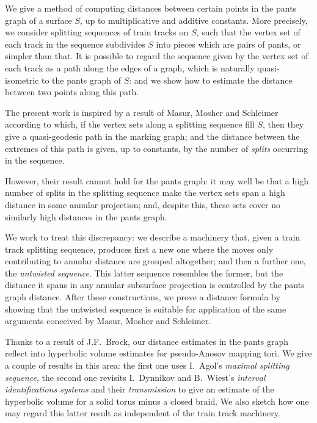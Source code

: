 We give a method of computing distances between certain points in the pants graph of a surface $S$, up to multiplicative and additive constants. More precisely, we consider splitting sequences of train tracks on $S$, such that the vertex set of each track in the sequence subdivides $S$ into pieces which are pairs of pants, or simpler than that. It is possible to regard the sequence given by the vertex set of each track as a path along the edges of a graph, which is naturally quasi-isometric to the pants graph of $S$: and we show how to estimate the distance between two points along this path.

The present work is inspired by a result of Masur, Mosher and Schleimer according to which, if the vertex sets along a splitting sequence fill $S$, then they give a quasi-geodesic path in the marking graph; and the distance between the extremes of this path is given, up to constants, by the number of \emph{splits} occurring in the sequence.

However, their result cannot hold for the pants graph: it may well be that a high number of splits in the splitting sequence make the vertex sets span a high distance in some annular projection; and, despite this, these sets cover no similarly high distances in the pants graph.

We work to treat this discrepancy: we describe a machinery that, given a train track splitting sequence, produces first a new one where the moves only contributing to annular distance are grouped altogether; and then a further one, the \emph{untwisted sequence}. This latter sequence resembles the former, but the distance it spans in any annular subsurface projection is controlled by the pants graph distance. After these constructions, we prove a distance formula by showing that the untwisted sequence is suitable for application of the same arguments conceived by Masur, Mosher and Schleimer.

Thanks to a result of J.F.~Brock, our distance estimates in the pants graph reflect into hyperbolic volume estimates for pseudo-Anosov mapping tori. We give a couple of results in this area: the first one uses I.~Agol's \emph{maximal splitting sequence}, the second one revisits I.~Dynnikov and B.~Wiest's \emph{interval identifications systems} and their \emph{transmission} to give an estimate of the hyperbolic volume for a solid torus minus a closed braid. We also sketch how one may regard this latter result as independent of the train track machinery.